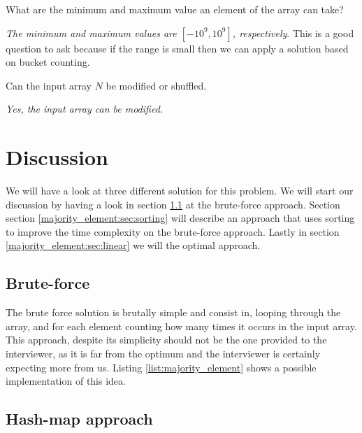 \begin{QandA}
	\item What are the minimum and maximum value an element of the array can take? 
	\begin{answered}
		\textit{The minimum and maximum values are $[-10^9, 10^9]$, respectively}.
		This is a good question to ask because if the range is small then we can apply a solution based on bucket counting.
	\end{answered}

	\item Can the input array $N$ be modified or shuffled. 
	\begin{answered}
		\textit{Yes, the input array can be modified.}
	\end{answered}
\end{QandA}

\section{Discussion}
\label{majority_element:sec:discussion}
We will have a look at three different solution for this problem. We will start our discussion by having a look in section \ref{majority_element:sec:bruteforce} at the brute-force approach. Section section \ref{majority_element:sec:sorting} will describe an approach that uses sorting to improve the time complexity on the brute-force approach. Lastly in section \ref{majority_element:sec:linear} we will the optimal approach.

\subsection{Brute-force}
\label{majority_element:sec:bruteforce}
The brute force solution is brutally simple and consist in, looping through the array, and for each element counting how many times it occurs in the input array. This approach, despite its simplicity should not be the one provided to the interviewer, as it is far from the optimum and the interviewer is certainly expecting more from us.
Listing \ref{list:majority_element} shows a possible implementation of this idea. 




\subsection{Hash-map approach}
\label{majority_element:sec:hashmap}

